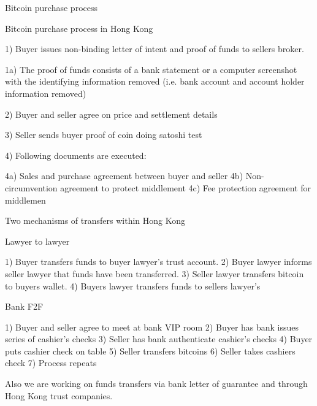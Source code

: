 \documentclass[10pt]{article}
\begin{document}
\begin{center}
{\Large Bitcoin purchase process}
\end{center}

Bitcoin purchase process in Hong Kong

1) Buyer issues non-binding letter of intent and proof of funds to
sellers broker.

1a) The proof of funds consists of a bank statement or a computer
screenshot with the identifying information removed (i.e. bank account
and account holder information removed)

2) Buyer and seller agree on price and settlement details

3) Seller sends buyer proof of coin doing satoshi test

4) Following documents are executed:

4a) Sales and purchase agreement between buyer and seller
4b) Non-circumvention agreement to protect middlement
4c) Fee protection agreement for middlemen

Two mechanisms of transfers within Hong Kong

Lawyer to lawyer

1) Buyer transfers funds to buyer lawyer’s trust account.
2) Buyer lawyer informs seller lawyer that funds have been transferred.
3) Seller lawyer transfers bitcoin to buyers wallet.
4) Buyers lawyer transfers funds to sellers lawyer’s

Bank F2F

1) Buyer and seller agree to meet at bank VIP room
2) Buyer has bank issues series of cashier’s checks
3) Seller has bank authenticate cashier’s checks
4) Buyer puts cashier check on table
5) Seller transfers bitcoins
6) Seller takes cashiers check
7) Process repeats

Also we are working on funds transfers via bank letter of guarantee and through Hong Kong trust companies.
\end{document}
